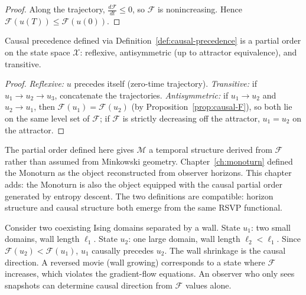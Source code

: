 \begin{proof}
  Along the trajectory, $\frac{d\mathcal{F}}{dt} \leq 0$,
  so $\mathcal{F}$ is nonincreasing.
  Hence $\mathcal{F}(u(T)) \leq \mathcal{F}(u(0))$.
\end{proof}

\begin{theorem}
  \label{thm:partial-order}
  \statusproven{}
  Causal precedence defined via Definition~\ref{def:causal-precedence}
  is a partial order on the state space $\mathcal{X}$:
  reflexive, antisymmetric (up to attractor equivalence),
  and transitive.
\end{theorem}

\begin{proof}
  \emph{Reflexive:} $u$ precedes itself (zero-time trajectory).
  \emph{Transitive:} if $u_1 \to u_2 \to u_3$, concatenate
  the trajectories.
  \emph{Antisymmetric:} if $u_1 \to u_2$ and $u_2 \to u_1$,
  then $\mathcal{F}(u_1) = \mathcal{F}(u_2)$ (by
  Proposition~\ref{prop:causal-F}), so both lie on the same
  level set of $\mathcal{F}$; if $\mathcal{F}$ is strictly
  decreasing off the attractor, $u_1 = u_2$ on the attractor.
\end{proof}

\begin{ChapterConnection}
  The partial order defined here gives $\mathcal{M}$ a temporal
  structure derived from $\mathcal{F}$ rather than assumed from
  Minkowski geometry.
  Chapter~\ref{ch:monoturn} defined the Monoturn as the object
  reconstructed from observer horizons.
  This chapter adds: the Monoturn is also the object equipped
  with the causal partial order generated by entropy descent.
  The two definitions are compatible: horizon structure and
  causal structure both emerge from the same RSVP functional.
\end{ChapterConnection}

\begin{WorkedExample}
  Consider two coexisting Ising domains separated by a wall.
  State $u_1$: two small domains, wall length $\ell_1$.
  State $u_2$: one large domain, wall length $\ell_2 < \ell_1$.
  Since $\mathcal{F}(u_2) < \mathcal{F}(u_1)$,
  $u_1$ causally precedes $u_2$.
  The wall shrinkage is the causal direction.
  A reversed movie (wall growing) corresponds to a state where
  $\mathcal{F}$ increases, which violates the gradient-flow
  equations.
  An observer who only sees snapshots can determine causal
  direction from $\mathcal{F}$ values alone.
\end{WorkedExample}


